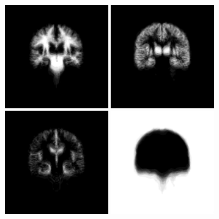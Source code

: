 \documentclass[10pt,twoside]{book}
\begin{document}
\begin{figure}
  \centering
  \begin{subfigure}{0.64\textwidth}
    \centering
      \includegraphics[width=0.49\textwidth]{tissueAtlas_affine_tissueNumber2}
      \includegraphics[width=0.49\textwidth]{tissueAtlas_affine_tissueNumber3}
      \includegraphics[width=0.49\textwidth]{tissueAtlas_affine_tissueNumber4}
      \includegraphics[width=0.49\textwidth]{tissueAtlas_affine_tissueNumber1}

\end{subfigure}
\end{figure}
\end{document}
